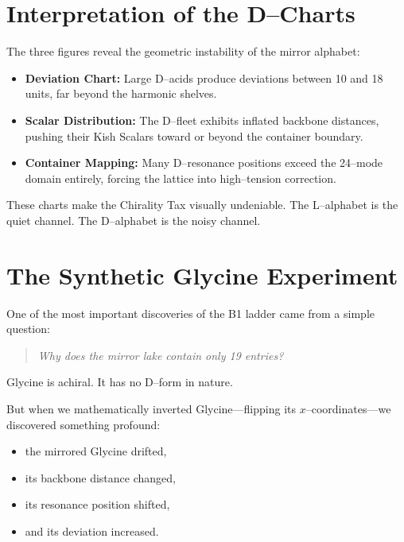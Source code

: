 \documentclass[11pt, letterpaper, openany]{book}
\begin{document}
\section{Interpretation of the D–Charts}

The three figures reveal the geometric instability of the mirror alphabet:

\begin{itemize}
    \item \textbf{Deviation Chart:}  
    Large D–acids produce deviations between 10 and 18 units, far beyond the
    harmonic shelves.

    \item \textbf{Scalar Distribution:}  
    The D–fleet exhibits inflated backbone distances, pushing their Kish Scalars
    toward or beyond the container boundary.

    \item \textbf{Container Mapping:}  
    Many D–resonance positions exceed the 24–mode domain entirely, forcing the
    lattice into high–tension correction.
\end{itemize}

These charts make the Chirality Tax visually undeniable.  
The L–alphabet is the quiet channel.  
The D–alphabet is the noisy channel.


\section{The Synthetic Glycine Experiment}

One of the most important discoveries of the B1 ladder came from a simple
question:

\begin{quote}
\textit{Why does the mirror lake contain only 19 entries?}
\end{quote}

Glycine is achiral.  
It has no D–form in nature.

But when we mathematically inverted Glycine—flipping its $x$–coordinates—we
discovered something profound:

\begin{itemize}
    \item the mirrored Glycine drifted,
    \item its backbone distance changed,
    \item its resonance position shifted,
    \item and its deviation increased.
\end{itemize}
\end{document}
